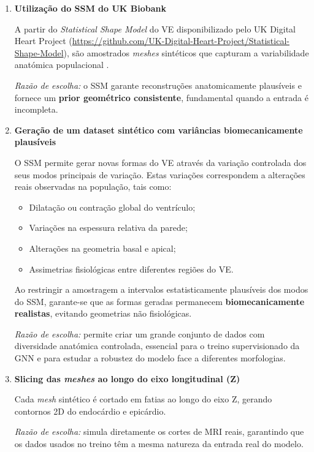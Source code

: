 \documentclass[12pt,a4paper]{report}
\begin{document}
\begin{enumerate}
    \item \textbf{Utilização do SSM do UK Biobank}

    A partir do \textit{Statistical Shape Model} do VE disponibilizado pelo UK Digital Heart Project (\url{https://github.com/UK-Digital-Heart-Project/Statistical-Shape-Model}), são amostrados \textit{meshes} sintéticos que capturam a variabilidade anatómica populacional \parencite{bai-2015,demarvao2014}.

    \textit{Razão de escolha:} o SSM garante reconstruções anatomicamente plausíveis e fornece um \textbf{prior geométrico consistente}, fundamental quando a entrada é incompleta.

    \item \textbf{Geração de um dataset sintético com variâncias biomecanicamente plausíveis}

    O SSM permite gerar novas formas do VE através da variação controlada dos seus modos principais de variação. Estas variações correspondem a alterações reais observadas na população, tais como:

    \begin{itemize}
        \item Dilatação ou contração global do ventrículo;
        \item Variações na espessura relativa da parede;
        \item Alterações na geometria basal e apical;
        \item Assimetrias fisiológicas entre diferentes regiões do VE.
    \end{itemize}

    Ao restringir a amostragem a intervalos estatisticamente plausíveis dos modos do SSM, garante-se que as formas geradas permanecem \textbf{biomecanicamente realistas}, evitando geometrias não fisiológicas.

    \textit{Razão de escolha:} permite criar um grande conjunto de dados com diversidade anatómica controlada, essencial para o treino supervisionado da GNN e para estudar a robustez do modelo face a diferentes morfologias.

    \item \textbf{Slicing das \textit{meshes} ao longo do eixo longitudinal (Z)}

    Cada \textit{mesh} sintético é cortado em fatias ao longo do eixo Z, gerando contornos 2D do endocárdio e epicárdio.

    \textit{Razão de escolha:} simula diretamente os cortes de MRI reais, garantindo que os dados usados no treino têm a mesma natureza da entrada real do modelo.


\end{enumerate}
\end{document}
